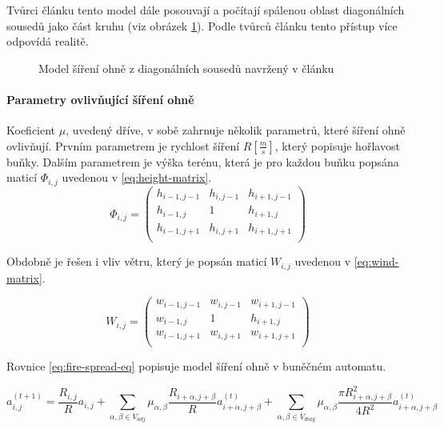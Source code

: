 \documentclass[11pt,a4paper]{scrartcl}
\begin{document}
	Tvůrci článku tento model dále posouvají a počítají spálenou oblast diagonálních sousedů jako část kruhu (viz obrázek \ref{fig:diag-model-new}). Podle tvůrců článku tento přístup více odpovídá realitě.
	
	\begin{figure}[H]
		\centering
		\caption{Model šíření ohně z diagonálních sousedů navržený v článku}
		\label{fig:diag-model-new}
	\end{figure}
	
	\paragraph{Parametry ovlivňující šíření ohně} Koeficient $\mu$, uvedený dříve, v sobě zahrnuje několik parametrů, které šíření ohně ovlivňují. Prvním parametrem je rychlost šíření $R [\frac{m}{s}]$, který popisuje hořlavost buňky. Dalším parametrem je výška terénu, která je pro každou buňku popsána maticí $\Phi_{i,j}$ uvedenou v \ref{eq:height-matrix}.
\begin{equation}
	\Phi_{i,j} =
	\begin{pmatrix}
	h_{i-1,j-1}       & h_{i,j-1} & h_{i+1,j-1} \\
	h_{i-1,j}       & 1 & h_{i+1,j} \\
	h_{i-1,j+1}       & h_{i,j+1} & h_{i+1,j+1} \\
	\end{pmatrix}
	\label{eq:height-matrix}
\end{equation}	
	
	Obdobně je řešen i vliv větru, který je popsán maticí $W_{i,j}$ uvedenou v \ref{eq:wind-matrix}.
	
	\begin{equation}
	W_{i,j} =
	\begin{pmatrix}
	w_{i-1,j-1}       & w_{i,j-1} & w_{i+1,j-1} \\
	w_{i-1,j}       & 1 & h_{i+1,j} \\
	w_{i-1,j+1}       & w_{i,j+1} & w_{i+1,j+1} \\
	\end{pmatrix}
	\label{eq:wind-matrix}
	\end{equation}	
	
	Rovnice \ref{eq:fire-spread-eq} popisuje model šíření ohně v buněčném automatu.
	
	\begin{equation}
	a_{i,j}^{(t+1)} = \frac{R_{i,j}}{R}a_{i,j} + 
	\sum_{\alpha,\beta \in V_{adj}} \mu_{\alpha,\beta} \frac{R_{i + \alpha, j+\beta}}{R} a_{i + \alpha, j + \beta} ^{(t)} + 
	\sum_{\alpha,\beta \in V_{diag}} \mu_{\alpha,\beta} \frac{\pi R_{i + \alpha, j+\beta} ^2}{4R^2} a_{i + \alpha, j + \beta} ^{(t)}	
	\label{eq:fire-spread-eq}
	\end{equation}
	
\end{document}
